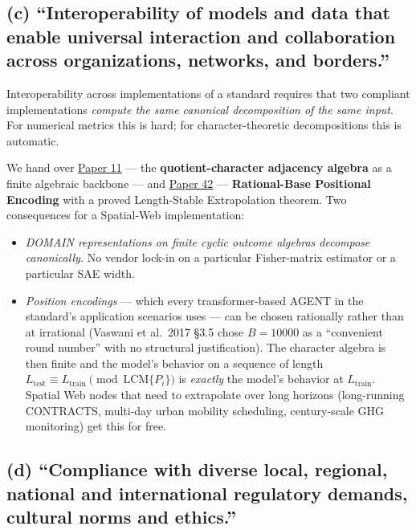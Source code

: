 \documentclass[
  letterpaper,
  11pt]{article}
\providecommand{\tightlist}{%
  \setlength{\itemsep}{0pt}\setlength{\parskip}{0pt}}
\theoremstyle{plain}
\theoremstyle{definition}
\theoremstyle{remark}
\begin{document}
\subsection{(c) ``Interoperability of models and data that enable universal interaction and collaboration across organizations, networks, and borders.''}\label{c-interoperability-of-models-and-data-that-enable-universal-interaction-and-collaboration-across-organizations-networks-and-borders.}

Interoperability across implementations of a standard requires that two compliant implementations \emph{compute the same canonical decomposition of the same input}. For numerical metrics this is hard; for character-theoretic decompositions this is automatic.

We hand over \href{C:/Projects/simplicial/11.quotient_character_adjacency_algebras.md}{Paper 11} --- the \textbf{quotient-character adjacency algebra} as a finite algebraic backbone --- and \href{C:/Projects/simplicial/42_sinusoidal_pe_as_non_rational_conductor_algebra.md}{Paper 42} --- \textbf{Rational-Base Positional Encoding} with a proved Length-Stable Extrapolation theorem. Two consequences for a Spatial-Web implementation:

\begin{itemize}
\tightlist
\item
  \emph{DOMAIN representations on finite cyclic outcome algebras decompose canonically.} No vendor lock-in on a particular Fisher-matrix estimator or a particular SAE width.
\item
  \emph{Position encodings} --- which every transformer-based AGENT in the standard's application scenarios uses --- can be chosen rationally rather than at irrational (Vaswani et al.~2017 §3.5 chose \(B = 10000\) as a ``convenient round number'' with no structural justification). The character algebra is then finite and the model's behavior on a sequence of length \(L_{\text{test}} \equiv L_{\text{train}} \pmod{\mathrm{LCM}\{P_i\}}\) is \emph{exactly} the model's behavior at \(L_{\text{train}}\). Spatial Web nodes that need to extrapolate over long horizons (long-running CONTRACTS, multi-day urban mobility scheduling, century-scale GHG monitoring) get this for free.
\end{itemize}

\subsection{(d) ``Compliance with diverse local, regional, national and international regulatory demands, cultural norms and ethics.''}\label{d-compliance-with-diverse-local-regional-national-and-international-regulatory-demands-cultural-norms-and-ethics.}
\end{document}
